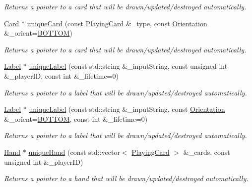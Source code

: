 \begin{DoxyCompactItemize}
\begin{DoxyCompactList}\small\item\em Returns a pointer to a card that will be drawn/updated/destroyed automatically. \end{DoxyCompactList}\item 
\hyperlink{classGUI_1_1Card}{Card} $\ast$ \hyperlink{classGUI_1_1DealerGUI_abe813d72472a743e56ed6a456230a217}{unique\-Card} (const \hyperlink{classPlayingCard}{Playing\-Card} \&\-\_\-type, const \hyperlink{namespaceGUI_a1a3a8094d47f7be06ce123fab38abf6a}{Orientation} \&\-\_\-orient=\hyperlink{namespaceGUI_a1a3a8094d47f7be06ce123fab38abf6aafb2c9cf323a63df7a7ac4ade2e4e63e5}{B\-O\-T\-T\-O\-M})
\begin{DoxyCompactList}\small\item\em Returns a pointer to a card that will be drawn/updated/destroyed automatically. \end{DoxyCompactList}\item 
\hyperlink{classGUI_1_1Label}{Label} $\ast$ \hyperlink{classGUI_1_1DealerGUI_a2b3184e9a70c7c6373a4889e3e0fc23e}{unique\-Label} (const std\-::string \&\-\_\-input\-String, const unsigned int \&\-\_\-player\-I\-D, const int \&\-\_\-lifetime=0)
\begin{DoxyCompactList}\small\item\em Returns a pointer to a label that will be drawn/updated/destroyed automatically. \end{DoxyCompactList}\item 
\hyperlink{classGUI_1_1Label}{Label} $\ast$ \hyperlink{classGUI_1_1DealerGUI_ae36a17f5b0739c02b2c35e3d15715817}{unique\-Label} (const std\-::string \&\-\_\-input\-String, const \hyperlink{namespaceGUI_a1a3a8094d47f7be06ce123fab38abf6a}{Orientation} \&\-\_\-orient=\hyperlink{namespaceGUI_a1a3a8094d47f7be06ce123fab38abf6aafb2c9cf323a63df7a7ac4ade2e4e63e5}{B\-O\-T\-T\-O\-M}, const int \&\-\_\-lifetime=0)
\begin{DoxyCompactList}\small\item\em Returns a pointer to a label that will be drawn/updated/destroyed automatically. \end{DoxyCompactList}\item 
\hyperlink{classGUI_1_1Hand}{Hand} $\ast$ \hyperlink{classGUI_1_1DealerGUI_a5b30e8379e6d9782c6f3d4f834b1e567}{unique\-Hand} (const std\-::vector$<$ \hyperlink{classPlayingCard}{Playing\-Card} $>$ \&\-\_\-cards, const unsigned int \&\-\_\-player\-I\-D)
\begin{DoxyCompactList}\small\item\em Returns a pointer to a hand that will be drawn/updated/destroyed automatically. \end{DoxyCompactList}\item 

\end{DoxyCompactItemize}
